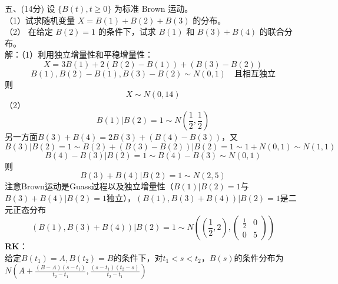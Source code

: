 \documentclass[UTF8,openany]{book}
\begin{document}
\noindent 五、(14分) 设 $\{B(t), t \geq 0\}$ 为标准 Brown 运动。\\
（1）试求随机变量 $X = B(1) + B(2) + B(3)$ 的分布。\\
（2） 在给定 $B(2) = 1$ 的条件下，试求 $B(1)$ 和 $B(3) + B(4)$ 的联合分布。\\
解：（1）利用独立增量性和平稳增量性：\\
\[
X=3B(1)+2(B(2)-B(1))+(B(3)-B(2))
\]
\[
B(1),B(2)-B(1),B(3)-B(2) \sim N(0,1) \quad \text{且相互独立}
\]
则
\[
X \sim N(0,14)
\]
（2）
\[
B(1)|B(2)=1 \sim N\left(\frac{1}{2},\frac{1}{2}\right)
\]
另一方面$B(3)+B(4)=2B(3)+(B(4)-B(3))$，又
\[
B(3)|B(2)=1 \sim B(2)+(B(3)-B(2))|B(2)=1\sim 1+N(0,1) \sim N(1,1)
\]
\[
B(4)-B(3)|B(2)=1\sim B(4)-B(3)\sim N(0,1)
\]
则
\[
B(3)+B(4)|B(2)=1 \sim N(2,5)
\]
注意Brown运动是Guass过程以及独立增量性（$B(1)|B(2)=1$与$B(3)+B(4)|B(2)=1$独立），$(B(1),B(3)+B(4))|B(2)=1$是二元正态分布
\[
(B(1),B(3)+B(4))|B(2)=1 \sim N\left( \left( \frac{1}{2},2\right),
\begin{pmatrix}
	\frac{1}{2} & 0\\
	0& 5
\end{pmatrix}
\right) 
\]
\textbf{RK}：\\
给定$B(t_1)=A,B(t_2)=B$的条件下，对$t_1<s<t_2$，$B(s)$的条件分布为$N\left(A+\frac{(B-A)(s-t_1)}{t_2-t_1},\frac{(s-t_1)(t_2-s)}{t_2-t_1}\right)$\\
\end{document}
